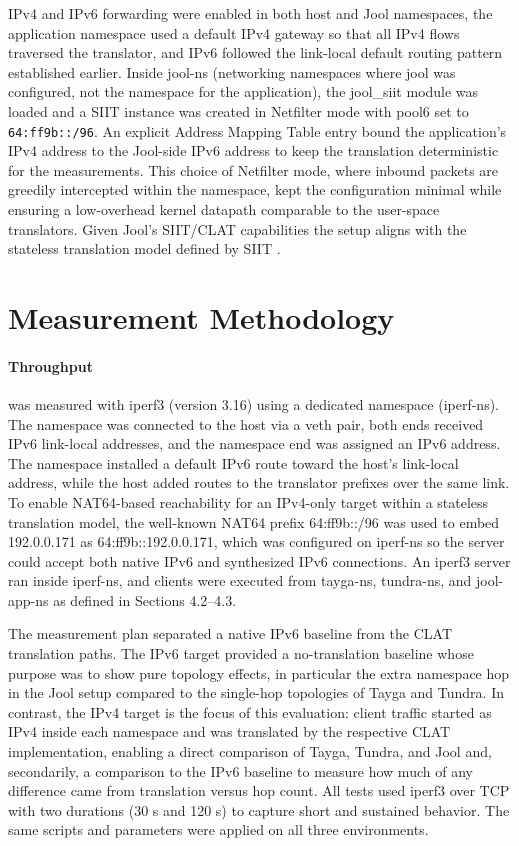 IPv4 and IPv6 forwarding were enabled in both host and Jool namespaces, the application namespace used a default IPv4 gateway so that all IPv4 flows traversed the translator, and IPv6 followed the link-local default routing pattern established earlier. Inside jool-ns (networking namespaces where jool was configured, not the namespace for the application), the jool\_siit module was loaded and a SIIT instance was created in Netfilter mode with pool6 set to \texttt{64:ff9b::/96}. An explicit Address Mapping Table entry bound the application’s IPv4 address to the Jool-side IPv6 address to keep the translation deterministic for the measurements. This choice of Netfilter mode, where inbound packets are greedily intercepted within the namespace, kept the configuration minimal while ensuring a low-overhead kernel datapath comparable to the user-space translators\cite{jool_introduction}. Given Jool’s SIIT/CLAT capabilities the setup aligns with the stateless translation model defined by SIIT \cite{jool_introduction,rfc7915}.


\section{Measurement Methodology}
\paragraph{Throughput} was measured with iperf3 (version 3.16) using a dedicated namespace (iperf-ns). The namespace was connected to the host via a veth pair, both ends received IPv6 link-local addresses, and the namespace end was assigned an IPv6 address. The namespace installed a default IPv6 route toward the host’s link-local address, while the host added routes to the translator prefixes over the same link. To enable NAT64-based reachability for an IPv4-only target within a stateless translation model, the well-known NAT64 prefix 64:ff9b::/96 was used to embed 192.0.0.171 as 64:ff9b::192.0.0.171, which was configured on iperf-ns so the server could accept both native IPv6 and synthesized IPv6 connections\cite{rfc7915}. An iperf3 server ran inside iperf-ns, and clients were executed from tayga-ns, tundra-ns, and jool-app-ns as defined in Sections 4.2–4.3.

The measurement plan separated a native IPv6 baseline from the CLAT translation paths. The IPv6 target provided a no-translation baseline whose purpose was to show pure topology effects, in particular the extra namespace hop in the Jool setup compared to the single-hop topologies of Tayga and Tundra. In contrast, the IPv4 target is the focus of this evaluation: client traffic started as IPv4 inside each namespace and was translated by the respective CLAT implementation, enabling a direct comparison of Tayga, Tundra, and Jool and, secondarily, a comparison to the IPv6 baseline to measure how much of any difference came from translation versus hop count. All tests used iperf3 over TCP with two durations (30 s and 120 s) to capture short and sustained behavior. The same scripts and parameters were applied on all three environments. 

